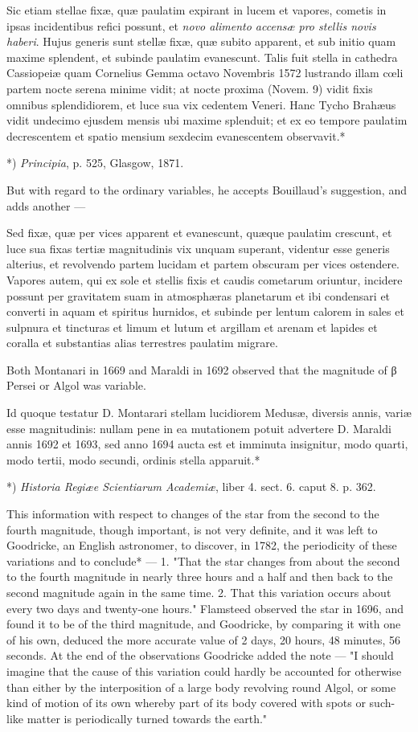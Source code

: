 \documentclass[a4paper, 12pt, oneside, polutonikogreek, english]{article}
\begin{document}
Sic etiam stellae fixæ, quæ paulatim expirant in lucem et vapores, cometis in ipsas incidentibus refici possunt, et \emph{novo alimento accensæ pro stellis novis haberi}. Hujus generis sunt stellæ fixæ, quæ subito apparent, et sub initio quam maxime splendent, et subinde paulatim evanescunt. Talis fuit stella in cathedra Cassiopeiæ quam Cornelius Gemma octavo Novembris 1572 lustrando illam cœli partem nocte serena minime vidit; at nocte proxima (Novem. 9) vidit fixis omnibus splendidiorem, et luce sua vix cedentem Veneri. Hanc Tycho Brahæus vidit undecimo ejusdem mensis ubi maxime splenduit; et ex eo tempore paulatim decrescentem et spatio mensium sexdecim evanescentem observavit.*

*) \emph{Principia}, p. 525, Glasgow, 1871.

But with regard to the ordinary variables, he accepts Bouillaud's suggestion, and adds another ---

Sed fixæ, quæ per vices apparent et evanescunt, quæque paulatim crescunt, et luce sua fixas tertiæ magnitudinis vix unquam superant, videntur esse generis alterius, et revolvendo partem lucidam et partem obscuram per vices ostendere. Vapores autem, qui ex sole et stellis fixis et caudis cometarum oriuntur, incidere possunt per gravitatem suam in atmosphæras planetarum et ibi condensari et converti in aquam et spiritus hurnidos, et subinde per lentum calorem in sales et sulpnura et tincturas et limum et lutum et argillam et arenam et lapides et coralla et substantias alias terrestres paulatim migrare.

Both Montanari in 1669 and Maraldi in 1692 observed that the magnitude of β Persei or Algol was variable.

Id quoque testatur D. Montarari stellam lucidiorem Medusæ, diversis annis, variæ esse magnitudinis: nullam pene in ea mutationem potuit advertere D. Maraldi annis 1692 et 1693, sed anno 1694 aucta est et imminuta insignitur, modo quarti, modo tertii, modo secundi, ordinis stella apparuit.*

*) \emph{Historia Regiæe Scientiarum Academiæ}, liber 4. sect. 6. caput 8. p. 362.

This information with respect to changes of the star from the second to the fourth magnitude, though important, is not very definite, and it was left to Goodricke, an English astronomer, to discover, in 1782, the periodicity of these variations and to conclude* --- 1. "That the star changes from about the second to the fourth magnitude in nearly three hours and a half and then back to the second magnitude again in the same time. 2. That this variation occurs about every two days and twenty-one hours." Flamsteed observed the star in 1696, and found it to be of the third magnitude, and Goodricke, by comparing it with one of his own, deduced the more accurate value of 2 days, 20 hours, 48 minutes, 56 seconds. At the end of the observations Goodricke added the note --- "I should imagine that the cause of this variation could hardly be accounted for otherwise than either by the interposition of a large body revolving round Algol, or some kind of motion of its own whereby part of its body covered with spots or such-like matter is periodically turned towards the earth."
\end{document}
